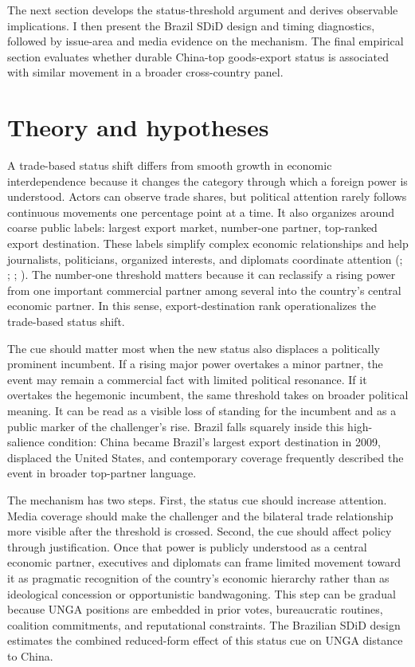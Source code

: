 \documentclass[
  12pt,
]{article}
\begin{document}
The next section develops the status-threshold argument and derives observable implications. I then present the Brazil SDiD design and timing diagnostics, followed by issue-area and media evidence on the mechanism. The final empirical section evaluates whether durable China-top goods-export status is associated with similar movement in a broader cross-country panel.

\section{Theory and hypotheses}\label{theory-and-hypotheses}

A trade-based status shift differs from smooth growth in economic interdependence because it changes the category through which a foreign power is understood. Actors can observe trade shares, but political attention rarely follows continuous movements one percentage point at a time. It also organizes around coarse public labels: largest export market, number-one partner, top-ranked export destination. These labels simplify complex economic relationships and help journalists, politicians, organized interests, and diplomats coordinate attention (; ; ; ). The number-one threshold matters because it can reclassify a rising power from one important commercial partner among several into the country's central economic partner. In this sense, export-destination rank operationalizes the trade-based status shift.

The cue should matter most when the new status also displaces a politically prominent incumbent. If a rising major power overtakes a minor partner, the event may remain a commercial fact with limited political resonance. If it overtakes the hegemonic incumbent, the same threshold takes on broader political meaning. It can be read as a visible loss of standing for the incumbent and as a public marker of the challenger's rise. Brazil falls squarely inside this high-salience condition: China became Brazil's largest export destination in 2009, displaced the United States, and contemporary coverage frequently described the event in broader top-partner language.

The mechanism has two steps. First, the status cue should increase attention. Media coverage should make the challenger and the bilateral trade relationship more visible after the threshold is crossed. Second, the cue should affect policy through justification. Once that power is publicly understood as a central economic partner, executives and diplomats can frame limited movement toward it as pragmatic recognition of the country's economic hierarchy rather than as ideological concession or opportunistic bandwagoning. This step can be gradual because UNGA positions are embedded in prior votes, bureaucratic routines, coalition commitments, and reputational constraints. The Brazilian SDiD design estimates the combined reduced-form effect of this status cue on UNGA distance to China.
\end{document}
